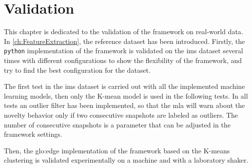 \chapter{Validation}
\label{sec:Validation}

This chapter is dedicated to the validation of the framework on real-world data. In \autoref{ch:FeatureExtraction}, the reference dataset \cite{lee2007bearingdataset} has been introduced. Firstly, the \texttt{python} implementation of the framework is validated on the \gls{ims} dataset several times with different configurations to show the flexibility of the framework, and try to find the best configuration for the dataset. 

The first test in the \gls{ims} dataset is carried out with all the implemented machine learning models, then only the K-mean model is used in the following tests. In all tests an outlier filter has been implemented, so that the \gls{mla} will warn about the novelty behavior only if two consecutive snapshots are labeled as outliers. The number of consecutive snapshots is a parameter that can be adjusted in the framework settings.

Then, the \gls{glo:edge} implementation of the framework based on the K-means clustering is validated experimentally on a machine and with a laboratory shaker.









